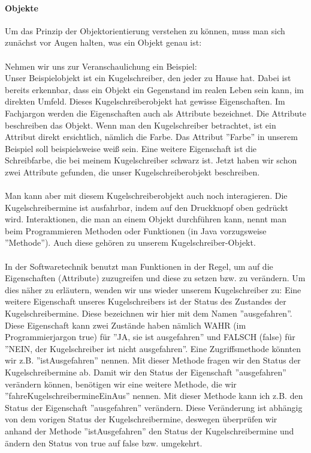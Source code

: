 \paragraph{Objekte}
Um das Prinzip der Objektorientierung verstehen zu können, muss man sich zunächst vor Augen halten, was ein Objekt genau ist:\\
\\
Nehmen wir uns zur Veranschaulichung ein Beispiel:\\
Unser Beispielobjekt ist ein Kugelschreiber, den jeder zu Hause hat. Dabei ist bereits erkennbar, dass ein Objekt ein Gegenstand im realen Leben sein kann, im direkten Umfeld. Dieses Kugelschreiberobjekt hat gewisse Eigenschaften. Im Fachjargon werden die Eigenschaften auch als Attribute bezeichnet. Die Attribute beschreiben das Objekt. Wenn man den Kugelschreiber betrachtet, ist ein Attribut direkt ersichtlich, nämlich die Farbe. Das Attribut ''Farbe'' in unserem Beispiel soll beispielsweise weiß sein. Eine weitere Eigenschaft ist die Schreibfarbe, die bei meinem Kugelschreiber schwarz ist. Jetzt haben wir schon zwei Attribute gefunden, die unser Kugelschreiberobjekt beschreiben.\\
\\
Man kann aber mit diesem Kugelschreiberobjekt auch noch interagieren. Die Kugelschreibermine ist ausfahrbar, indem auf den Druckknopf oben gedrückt wird. Interaktionen, die man an einem Objekt durchführen kann, nennt man beim Programmieren Methoden oder Funktionen (in Java vorzugsweise ''Methode''). Auch diese gehören zu unserem Kugelschreiber-Objekt.\\
\\
In der Softwaretechnik benutzt man Funktionen in der Regel, um auf die Eigenschaften (Attribute) zuzugreifen und  diese zu setzen bzw. zu verändern. Um dies näher zu erläutern, wenden wir uns wieder unserem Kugelschreiber zu: Eine weitere Eigenschaft unseres Kugelschreibers ist der Status des Zustandes der Kugelschreibermine. Diese bezeichnen wir hier mit dem Namen ''ausgefahren''. Diese Eigenschaft kann zwei Zustände haben nämlich WAHR (im Programmierjargon true) für ''JA, sie ist ausgefahren'' und FALSCH (false) für ''NEIN, der Kugelschreiber ist nicht ausgefahren''. Eine Zugriffsmethode könnten wir z.B. ''istAusgefahren'' nennen. Mit dieser Methode fragen wir den Status der Kugelschreibermine ab. Damit wir den Status der Eigenschaft ''ausgefahren'' verändern können, benötigen wir eine weitere Methode, die wir ''fahreKugelschreibermineEinAus'' nennen. Mit dieser Methode kann ich z.B. den Status der Eigenschaft ''ausgefahren'' verändern. Diese Veränderung ist abhängig von dem vorigen Status der Kugelschreibermine, deswegen überprüfen wir anhand der Methode ''istAusgefahren'' den Status der Kugelschreibermine und ändern den Status von true auf false bzw. umgekehrt.\\
